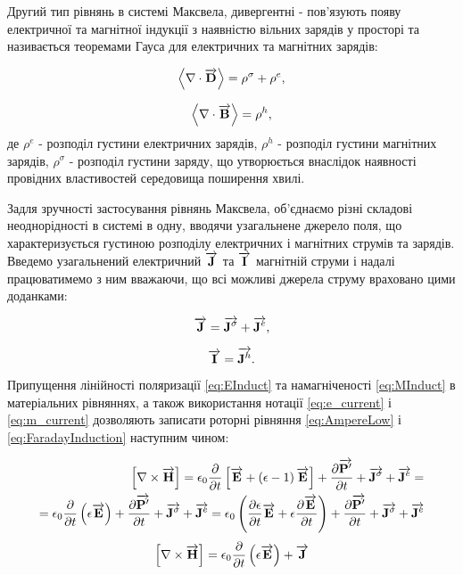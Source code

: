 Другий тип рівнянь в системі Максвела, дивергентні - пов'язують появу 
електричної та магнітної індукції з наявністю вільних зарядів у просторі 
та називається теоремами Гауса для електричних та магнітних зарядів:

\begin{equation} \label{eq:GaussTheorem}
\left< \nabla \cdot \overrightarrow{\mathbf D} \right> = \rho^\sigma + \rho^e,
\end{equation}

\begin{equation} \label{eq:GaussMagnetic}
\left< \nabla \cdot \overrightarrow{\mathbf B} \right> = \rho^h,
\end{equation}
%
де $ \rho^e $ - розподіл густини електричних зарядів, $ \rho^h $ - розподіл
густини магнітних зарядів, $ \rho^\sigma $ - розподіл густини заряду, що
утворюється внаслідок наявності провідних властивостей середовища 
поширення хвилі.

Задля зручності застосування рівнянь Максвела, об'єднаємо різні складові 
неоднорідності в системі в одну, вводячи узагальнене джерело поля, що 
характеризується густиною розподілу електричних і магнітних струмів та 
зарядів. Введемо узагальнений електричний $ \overrightarrow{\mathbf J} $ та $ \overrightarrow{\mathbf I} $ магнітній 
струми і надалі працюватимемо з ним вважаючи, що всі можливі джерела струму 
враховано цими доданками:

\begin{equation} \label{eq:e_current}
\overrightarrow{\mathbf J} = \overrightarrow{\mathbf J^\sigma} + \overrightarrow{\mathbf J^e},
\end{equation}

\begin{equation} \label{eq:m_current}
\overrightarrow{\mathbf I} = \overrightarrow{\mathbf J^h}.
\end{equation}

Припущення лінійності поляризації \eqref{eq:EInduct} та намагніченості 
\eqref{eq:MInduct} в матеріальних рівняннях, а також використання нотації
\eqref{eq:e_current} і \eqref{eq:m_current} дозволяють записати роторні 
рівняння \eqref{eq:AmpereLow} і \eqref{eq:FaradayInduction} наступним чином:

\textcolor{blue}{ \begin{equation*} \begin{aligned}
\left[ \nabla \times \overrightarrow{\mathbf H} \right] = \epsilon_0 \frac{\partial }{\partial t} \left[ 
\overrightarrow{\mathbf E} + \left( \epsilon - 1 \right) \overrightarrow{\mathbf E} \right] + 
\frac{\partial \overrightarrow{\mathbf P^\prime}}{\partial t} + \overrightarrow{\mathbf J^\sigma} + \overrightarrow{\mathbf J^e}= \\
= \epsilon_0 \frac{\partial }{\partial t} \left( \epsilon \overrightarrow{\mathbf E} \right) +
\frac{\partial \overrightarrow{\mathbf P^\prime}}{\partial t} + \overrightarrow{\mathbf J^\sigma} + \overrightarrow{\mathbf J^e} = 
\epsilon_0 \left( \frac{\partial \epsilon}{\partial t} 
\overrightarrow{\mathbf E} + \epsilon \frac{\partial \overrightarrow{\mathbf E}}{\partial t} \right) + 
\frac{\partial \overrightarrow{\mathbf P^\prime}}{\partial t} + \overrightarrow{\mathbf J^\sigma} + \overrightarrow{\mathbf J^e}
\end{aligned} \end{equation*} }
%
\begin{equation} \label{eq:rotHfromE}
\left[ \nabla \times \overrightarrow{\mathbf H} \right] = 
\epsilon_0 \frac{\partial }{\partial t} \left( \epsilon \overrightarrow{\mathbf E} \right) + \overrightarrow{\mathbf J}
\end{equation}

